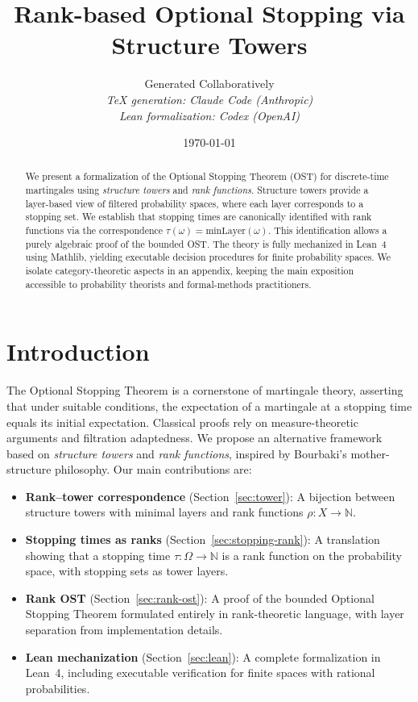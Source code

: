 \documentclass[11pt]{article}
\title{Rank-based Optional Stopping via Structure Towers}
\author{%
  Generated Collaboratively\\
  \small\textit{TeX generation: Claude Code (Anthropic)}\\
  \small\textit{Lean formalization: Codex (OpenAI)}%
}
\date{\today}
\theoremstyle{definition}
\theoremstyle{remark}
\newcommand{\minLayer}{\mathrm{minLayer}}
\newcommand{\NN}{\mathbb{N}}
\begin{document}
\maketitle

\begin{abstract}
We present a formalization of the Optional Stopping Theorem (OST) for discrete-time martingales using \emph{structure towers} and \emph{rank functions}.
Structure towers provide a layer-based view of filtered probability spaces, where each layer corresponds to a stopping set.
We establish that stopping times are canonically identified with rank functions via the correspondence $\tau(\omega) = \minLayer(\omega)$.
This identification allows a purely algebraic proof of the bounded OST.
The theory is fully mechanized in Lean~4 using Mathlib, yielding executable decision procedures for finite probability spaces.
We isolate category-theoretic aspects in an appendix, keeping the main exposition accessible to probability theorists and formal-methods practitioners.
\end{abstract}

\section{Introduction}
\label{sec:intro}

The Optional Stopping Theorem is a cornerstone of martingale theory, asserting that under suitable conditions, the expectation of a martingale at a stopping time equals its initial expectation.
Classical proofs rely on measure-theoretic arguments and filtration adaptedness.
We propose an alternative framework based on \emph{structure towers} and \emph{rank functions}, inspired by Bourbaki's mother-structure philosophy.
Our main contributions are:

\begin{itemize}
\item \textbf{Rank--tower correspondence} (Section~\ref{sec:tower}): A bijection between structure towers with minimal layers and rank functions $\rho: X \to \NN$.
\item \textbf{Stopping times as ranks} (Section~\ref{sec:stopping-rank}): A translation showing that a stopping time $\tau: \Omega \to \NN$ is a rank function on the probability space, with stopping sets as tower layers.
\item \textbf{Rank OST} (Section~\ref{sec:rank-ost}): A proof of the bounded Optional Stopping Theorem formulated entirely in rank-theoretic language, with layer separation from implementation details.
\item \textbf{Lean mechanization} (Section~\ref{sec:lean}): A complete formalization in Lean~4, including executable verification for finite spaces with rational probabilities.
\end{itemize}
\end{document}
